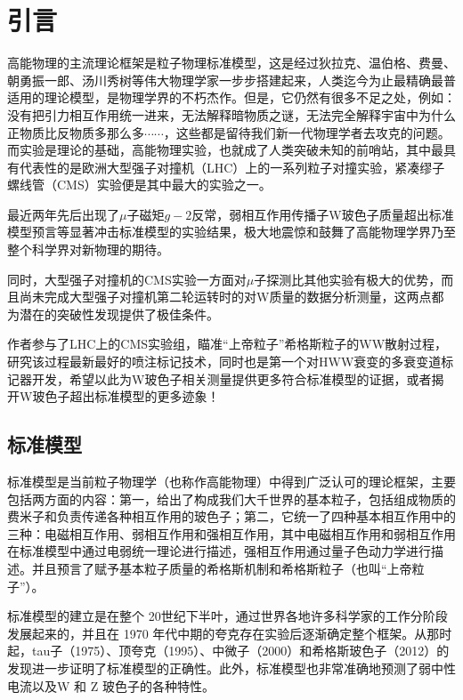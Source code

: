 \chapter{引言}
\label{chap1}
\fontsize{12bp}{14.4pt}

高能物理的主流理论框架是粒子物理标准模型，这是经过狄拉克、温伯格、费曼、朝勇振一郎、汤川秀树等伟大物理学家一步步搭建起来，人类迄今为止最精确最普适用的理论模型，是物理学界的不朽杰作。但是，它仍然有很多不足之处，例如：没有把引力相互作用统一进来，无法解释暗物质之谜，无法完全解释宇宙中为什么正物质比反物质多那么多$\cdots\cdots$，这些都是留待我们新一代物理学者去攻克的问题。而实验是理论的基础，高能物理实验，也就成了人类突破未知的前哨站，其中最具有代表性的是欧洲大型强子对撞机（LHC）上的一系列粒子对撞实验，紧凑缪子螺线管（CMS）实验便是其中最大的实验之一。

最近两年先后出现了$\mu$子磁矩$g-2$反常，弱相互作用传播子W玻色子质量超出标准模型预言等显著冲击标准模型的实验结果，极大地震惊和鼓舞了高能物理学界乃至整个科学界对新物理的期待。

同时，大型强子对撞机的CMS实验一方面对$\mu$子探测比其他实验有极大的优势，而且尚未完成大型强子对撞机第二轮运转时的对W质量的数据分析测量，这两点都为潜在的突破性发现提供了极佳条件。

作者参与了LHC上的CMS实验组，瞄准“上帝粒子”希格斯粒子的WW散射过程，研究该过程最新最好的喷注标记技术，同时也是第一个对HWW衰变的多衰变道标记器开发，希望以此为W玻色子相关测量提供更多符合标准模型的证据，或者揭开W玻色子超出标准模型的更多迹象！

\section{标准模型}
标准模型是当前粒子物理学（也称作高能物理）中得到广泛认可的理论框架，主要包括两方面的内容：第一，给出了构成我们大千世界的基本粒子，包括组成物质的费米子和负责传递各种相互作用的玻色子；第二，它统一了四种基本相互作用中的三种：电磁相互作用、弱相互作用和强相互作用，其中电磁相互作用和弱相互作用在标准模型中通过电弱统一理论进行描述，强相互作用通过量子色动力学进行描述。并且预言了赋予基本粒子质量的希格斯机制和希格斯粒子（也叫“上帝粒子”）。

标准模型的建立是在整个 20世纪下半叶，通过世界各地许多科学家的工作分阶段发展起来的，并且在 1970 年代中期的夸克存在实验后逐渐确定整个框架。从那时起，tau子（1975）、顶夸克（1995）、中微子（2000）和希格斯玻色子（2012）的发现进一步证明了标准模型的正确性。此外，标准模型也非常准确地预测了弱中性电流以及W 和 Z 玻色子的各种特性。
